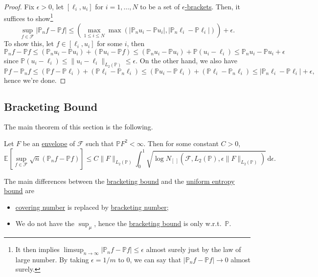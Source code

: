 \begin{proof}
	Fix \(\epsilon > 0\), let \([\ell _i, u_i]\) for \(i = 1, \dots , N\) to be a set of \hyperref[def:eps-bracket]{\(\epsilon \)-brackets}. Then, it suffices to show\footnote{It then implies \(\limsup_{n \to \infty} \vert \mathbb{P} _n f - \mathbb{P} f \vert \leq \epsilon \) almost surely just by the law of large number. By taking \(\epsilon = 1 / m\) to \(0\), we can say that \(\vert \mathbb{P} _n f - \mathbb{P} f \vert \to 0\) almost surely.}
	\[
		\sup _{f\in \mathscr{F} } \vert \mathbb{P} _n f - \mathbb{P} f \vert
		\leq \left( \max _{1 \leq i \leq N } \max (\vert \mathbb{P} _n u_i - \mathbb{P} u_i \vert , \vert \mathbb{P} _n \ell _i - \mathbb{P} \ell _i \vert ) \right) + \epsilon.
	\]
	To show this, let \(f\in [\ell _i, u_i]\) for some \(i\), then
	\[
		\mathbb{P} _n f - \mathbb{P} f
		\leq (\mathbb{P} _n u_i - \mathbb{P} u_i) + (\mathbb{P} u_i - \mathbb{P} f)
		\leq (\mathbb{P} _n u_i - \mathbb{P} u_i) + \mathbb{P} (u_i - \ell _i)
		\leq \mathbb{P} _n u_i - \mathbb{P} u_i + \epsilon
	\]
	since \(\mathbb{P} (u_i - \ell _i) \leq \lVert u_i - \ell _i \rVert _{L_2(\mathbb{P} )} \leq \epsilon \). On the other hand, we also have
	\[
		\mathbb{P} f - \mathbb{P} _n f
		\leq (\mathbb{P} f - \mathbb{P} \ell _i) + (\mathbb{P} \ell _i - \mathbb{P} _n \ell _i)
		\leq (\mathbb{P} u_i - \mathbb{P} \ell _i) + (\mathbb{P} \ell _i - \mathbb{P} _n \ell _i)
		\leq \vert \mathbb{P} _n \ell _i - \mathbb{P} \ell _i \vert + \epsilon,
	\]
	hence we're done.
\end{proof}

\subsection{Bracketing Bound}
The main theorem of this section is the following.

\begin{theorem}\label{thm:bracketing-bound}
	Let \(F\) be an \hyperref[def:envelope]{envelope} of \(\mathscr{F} \) such that \(\mathbb{P} F^2 < \infty \). Then for some constant \(C > 0\),
	\[
		\mathbb{E}_{}\left[\sup _{f\in \mathscr{F} } \sqrt{n} (\mathbb{P} _n f - \mathbb{P} f) \right]
		\leq C \lVert F \rVert _{L_2(\mathbb{P} )} \int_{0}^{1} \sqrt{\log N_{[\ ]}(\mathscr{F} , L_2(\mathbb{P} ), \epsilon \lVert F \rVert _{L_2(\mathbb{P} )})}  \,\mathrm{d}\epsilon .
	\]
\end{theorem}

\begin{remark}
	The main differences between the \hyperref[thm:bracketing-bound]{bracketing bound} and the \hyperref[thm:uniform-entropy-integral-bound]{uniform entropy bound} are
	\begin{itemize}
		\item \hyperref[def:covering-number]{covering number} is replaced by \hyperref[def:bracketing-number]{bracketing number};
		\item We do not have the \(\sup _\mu \), hence the \hyperref[thm:bracketing-bound]{bracketing bound} is only w.r.t.\ \(\mathbb{P} \).
	\end{itemize}
\end{remark}